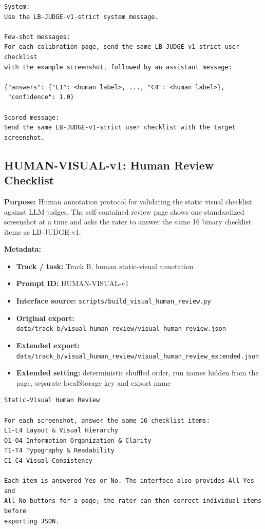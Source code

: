 \begingroup
\scriptsize
\begin{verbatim}
System:
Use the LB-JUDGE-v1-strict system message.

Few-shot messages:
For each calibration page, send the same LB-JUDGE-v1-strict user checklist
with the example screenshot, followed by an assistant message:

{"answers": {"L1": <human label>, ..., "C4": <human label>},
 "confidence": 1.0}

Scored message:
Send the same LB-JUDGE-v1-strict user checklist with the target screenshot.
\end{verbatim}
\endgroup

\subsection{HUMAN-VISUAL-v1: Human Review Checklist}
\label{app:prompt-human-visual-v1}

\textbf{Purpose:} Human annotation protocol for validating the static visual
checklist against LLM judges. The self-contained review page shows one
standardized screenshot at a time and asks the rater to answer the same
16 binary checklist items as LB-JUDGE-v1.

\textbf{Metadata:}
\begin{itemize}
  \item \textbf{Track / task:} Track B, human static-visual annotation
  \item \textbf{Prompt ID:} HUMAN-VISUAL-v1
  \item \textbf{Interface source:} \texttt{scripts/build\_visual\_human\_review.py}
  \item \textbf{Original export:}
  \texttt{data/track\_b/visual\_human\_review/visual\_human\_review.json}
  \item \textbf{Extended export:}
  \texttt{data/track\_b/visual\_human\_review/visual\_human\_review\_extended.json}
  \item \textbf{Extended setting:} deterministic shuffled order, run names
  hidden from the page, separate localStorage key and export name
\end{itemize}

\begingroup
\scriptsize
\begin{verbatim}
Static-Visual Human Review

For each screenshot, answer the same 16 checklist items:
L1-L4 Layout & Visual Hierarchy
O1-O4 Information Organization & Clarity
T1-T4 Typography & Readability
C1-C4 Visual Consistency

Each item is answered Yes or No. The interface also provides All Yes and
All No buttons for a page; the rater can then correct individual items before
exporting JSON.
\end{verbatim}
\endgroup

